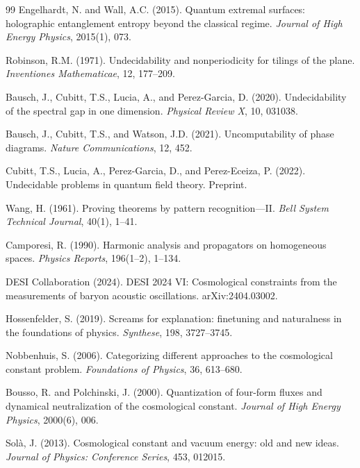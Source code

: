 \documentclass[11pt,a4paper]{report}
\theoremstyle{plain}
\theoremstyle{definition}
\theoremstyle{remark}
\begin{document}
\begin{thebibliography}{99}
 Engelhardt, N. and Wall, A.C. (2015). Quantum extremal surfaces: holographic entanglement entropy beyond the classical regime. \emph{Journal of High Energy Physics}, 2015(1), 073.

 Robinson, R.M. (1971). Undecidability and nonperiodicity for tilings of the plane. \emph{Inventiones Mathematicae}, 12, 177--209.

 Bausch, J., Cubitt, T.S., Lucia, A., and Perez-Garcia, D. (2020). Undecidability of the spectral gap in one dimension. \emph{Physical Review X}, 10, 031038.

 Bausch, J., Cubitt, T.S., and Watson, J.D. (2021). Uncomputability of phase diagrams. \emph{Nature Communications}, 12, 452.

 Cubitt, T.S., Lucia, A., Perez-Garcia, D., and Perez-Eceiza, P. (2022). Undecidable problems in quantum field theory. Preprint.

 Wang, H. (1961). Proving theorems by pattern recognition---II. \emph{Bell System Technical Journal}, 40(1), 1--41.

 Camporesi, R. (1990). Harmonic analysis and propagators on homogeneous spaces. \emph{Physics Reports}, 196(1--2), 1--134.

 DESI Collaboration (2024). DESI 2024 VI: Cosmological constraints from the measurements of baryon acoustic oscillations. arXiv:2404.03002.

 Hossenfelder, S. (2019). Screams for explanation: finetuning and naturalness in the foundations of physics. \emph{Synthese}, 198, 3727--3745.

 Nobbenhuis, S. (2006). Categorizing different approaches to the cosmological constant problem. \emph{Foundations of Physics}, 36, 613--680.

 Bousso, R. and Polchinski, J. (2000). Quantization of four-form fluxes and dynamical neutralization of the cosmological constant. \emph{Journal of High Energy Physics}, 2000(6), 006.

 Sol\`a, J. (2013). Cosmological constant and vacuum energy: old and new ideas. \emph{Journal of Physics: Conference Series}, 453, 012015.

\end{thebibliography}
\end{document}
